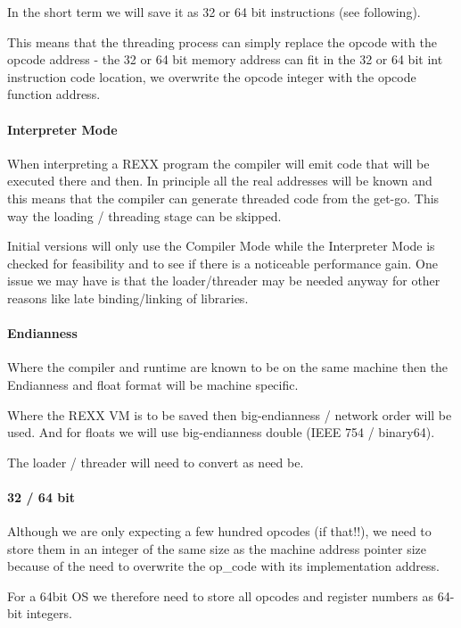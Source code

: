 In the short term we will save it as 32 or 64 bit instructions (see following).

This means that the threading process can simply
replace the opcode with the opcode address - the 32 or 64 bit memory address can
fit in the 32 or 64 bit int instruction code location, we overwrite the opcode
integer with the opcode function address.

\paragraph{Interpreter Mode}

When interpreting a REXX program the compiler will emit code that will be
executed there and then. In principle all the real addresses will be known and
this means that the compiler can generate threaded code from the get-go. This
way the loading / threading stage can be skipped.

Initial versions will only use the Compiler Mode while the Interpreter Mode is
checked for feasibility and to see if there is a noticeable performance gain. One
issue we may have is that the loader/threader may be needed anyway for other reasons
like late binding/linking of libraries.

\paragraph{Endianness}

Where the compiler and runtime are known to be on the same machine then the
Endianness and float format will be machine specific.

Where the REXX VM is to be saved then big-endianness / \textquotedbl{}network order\textquotedbl{} will be
used. And for floats we will use big-endianness double (IEEE 754 / binary64).

The loader / threader will need to convert as need be.

\paragraph{32 / 64 bit}

Although we are only expecting a few hundred opcodes (if that!!), we need to store
them in an integer of the same size as the machine address pointer size because
of the need to overwrite the op\_code with its implementation address.

For a 64bit OS we therefore need to store all opcodes and register numbers as 64-bit
integers.

